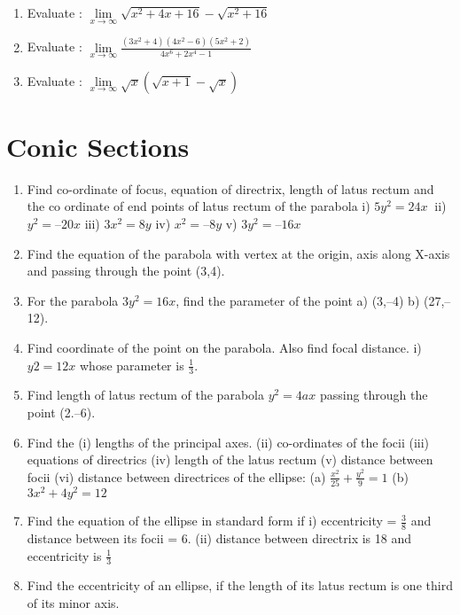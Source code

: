 \documentclass[14pt]{article}
\begin{document}
\begin{multicols}{2}
\begin{enumerate}[resume]
\item Evaluate : $ \lim\limits_{ x \to \infty } \sqrt{x^2+4x+16} - \sqrt{ x^2+16} $

\item Evaluate : $ \lim\limits_{ x \to \infty} \frac{(3x^2+4)(4x^2-6)(5x^2+2)}{4x^6+2x^4-1} $

\item Evaluate : $ \lim\limits_{ x \to \infty }\sqrt{x}\left( \sqrt{x+1} - \sqrt{x}\right) $

\end{enumerate} 


\section{Conic Sections}
\noindent
\begin{enumerate}[resume]
 \item  Find co-ordinate of focus, equation of directrix, length of latus rectum and the co ordinate of end points of latus rectum of the parabola i) $5y^2=24x\ $ ii) $y^2 = –20x$ iii) $3x^2 = 8y$ iv) $x^2 = –8y$ v) $3y ^2 = –16x$
\item Find the equation of the parabola with vertex at the origin, axis along X-axis and passing through the point (3,4).
\item For the parabola $3y^2 =16x$, find the parameter of the point a) (3,–4) b) (27,–12).

\item Find coordinate of the point on the parabola. Also find focal distance. i) $y 2 = 12x$ whose parameter is $\frac{1}{3}$.
 
\item Find length of latus rectum of the parabola $y^2 = 4ax$ passing through the point (2.–6).

\item Find the (i) lengths of the principal axes. (ii) co-ordinates of the focii (iii) equations of directrics (iv) length of the latus rectum (v) distance between focii (vi) distance between directrices of the ellipse: 
(a) $\frac{x^2}{25} + \frac{y^2}{9} = 1$ (b) $3x^2 + 4y^2 = 12$

\item Find the equation of the 		 ellipse in standard form if
i) eccentricity = $\frac{3}{8}$ and distance between its focii = 6.
(ii) distance between directrix is 18 and eccentricity is $\frac{1}{3}$

\item Find the eccentricity of an ellipse, if the length of its latus rectum is one third of its minor axis.


\end{enumerate}
\end{multicols}
\end{document}
